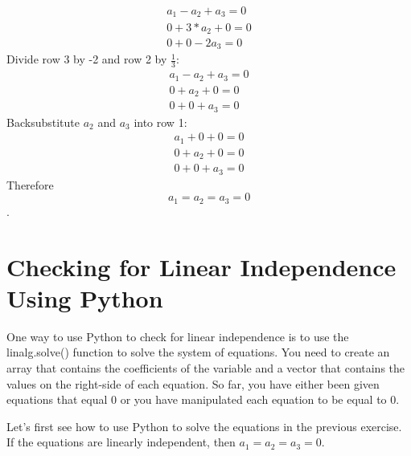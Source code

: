 \begin{Answer}[ref=vector_independence]
		$$\begin{matrix}
			a_1 - a_2 + a_3 = 0 \\
			0 + 3*a_2 + 0 = 0 \\
			0 + 0 - 2a_3 = 0
		\end{matrix} $$
    Divide row 3 by -2 and row 2 by $\frac{1}{3}$:
    	$$\begin{matrix}
			a_1 - a_2 + a_3 = 0 \\
			0 +  a_2 +0  = 0 \\
			0  + 0  + a_3 = 0
		\end{matrix} $$
	Backsubstitute $a_2$ and $a_3$ into row 1:
	 	$$\begin{matrix}
			a_1 + 0 + 0 = 0 \\
			0 +  a_2 + 0   = 0 \\
			0   + 0  + a_3 = 0
		\end{matrix} $$
	 Therefore $$a_1 = a_2 = a_3 = 0$$.
\end{Answer}
    
\section{Checking for Linear Independence Using Python}  
One way to use Python to check for linear independence is to use the 
linalg.solve() function to solve the system of equations. You need to create 
an array that contains the coefficients of the variable and a vector that 
contains the values on the right-side of each equation. So far, you have either 
been given equations that equal 0 or you have manipulated each equation to be 
equal to 0. 

Let's first see how to use Python to solve the equations in the previous 
exercise. If the equations are linearly independent, then $a_1 = a_2 = a_3 = 0$.


